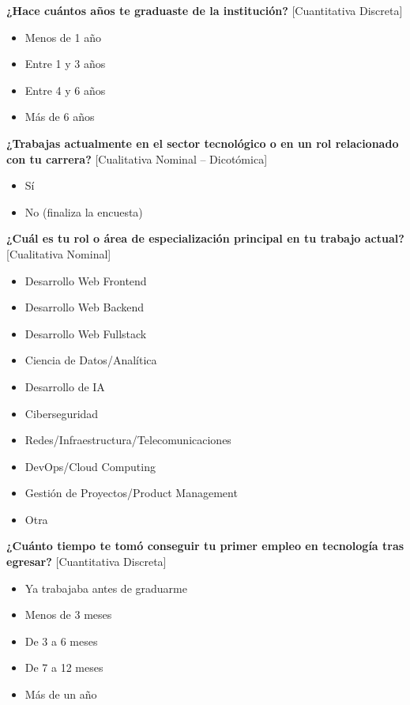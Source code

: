 \textbf{¿Hace cuántos años te graduaste de la institución?} [Cuantitativa Discreta]

\begin{itemize}
    \item Menos de 1 año
    \item Entre 1 y 3 años
    \item Entre 4 y 6 años
    \item Más de 6 años
\end{itemize}

\textbf{¿Trabajas actualmente en el sector tecnológico o en un rol relacionado con tu carrera?} [Cualitativa Nominal -- Dicotómica]

\begin{itemize}
    \item Sí
    \item No (finaliza la encuesta)
\end{itemize}

\textbf{¿Cuál es tu rol o área de especialización principal en tu trabajo actual?} [Cualitativa Nominal]

\begin{itemize}
    \item Desarrollo Web Frontend
    \item Desarrollo Web Backend
    \item Desarrollo Web Fullstack
    \item Ciencia de Datos/Analítica
    \item Desarrollo de IA
    \item Ciberseguridad
    \item Redes/Infraestructura/Telecomunicaciones
    \item DevOps/Cloud Computing
    \item Gestión de Proyectos/Product Management
    \item Otra
\end{itemize}

\textbf{¿Cuánto tiempo te tomó conseguir tu primer empleo en tecnología tras egresar?} [Cuantitativa Discreta]

\begin{itemize}
    \item Ya trabajaba antes de graduarme
    \item Menos de 3 meses
    \item De 3 a 6 meses
    \item De 7 a 12 meses
    \item Más de un año
\end{itemize}


